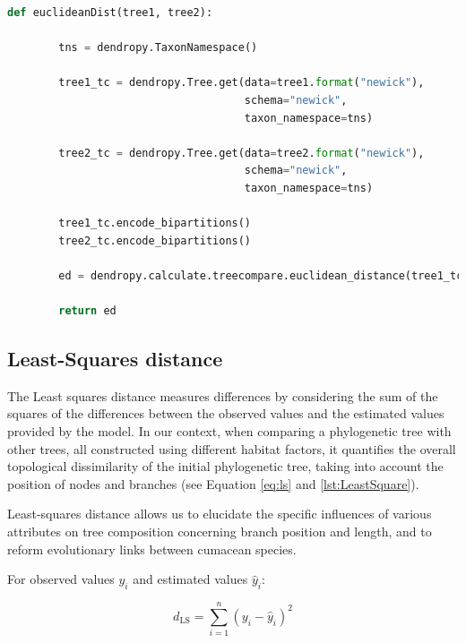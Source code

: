 \begin{lstlisting}[label=lst:euclideanDist,language=Python,caption=Python script for calculating the Euclidean distance using the ete3 package in the aPhyloGeo package]
    def euclideanDist(tree1, tree2):
        
        tns = dendropy.TaxonNamespace()
        
        tree1_tc = dendropy.Tree.get(data=tree1.format("newick"), 
                                     schema="newick", 
                                     taxon_namespace=tns)
                                     
        tree2_tc = dendropy.Tree.get(data=tree2.format("newick"), 
                                     schema="newick", 
                                     taxon_namespace=tns)
                                     
        tree1_tc.encode_bipartitions()
        tree2_tc.encode_bipartitions()

        ed = dendropy.calculate.treecompare.euclidean_distance(tree1_tc, tree2_tc)

        return ed
\end{lstlisting}

\subsection{Least-Squares distance}\label{LS}

The Least squares distance measures differences by considering the sum of the squares of the differences between the observed values and the estimated values provided by the model. In our context, when comparing a phylogenetic tree with other trees, all constructed using different habitat factors, it quantifies the overall topological dissimilarity of the initial phylogenetic tree, taking into account the position of nodes and branches (see Equation \eqref{eq:ls} and \autoref{lst:LeastSquare}).

Least-squares distance allows us to elucidate the specific influences of various attributes on tree composition concerning branch position and length, and to reform evolutionary links between cumacean species.

For observed values $y_i$ and estimated values $\hat{y}_i$:

\begin{equation}\label{eq:ls}
    d_{\text{LS}} = \sum_{i=1}^{n} (y_i - \hat{y}_i)^2
\end{equation}

